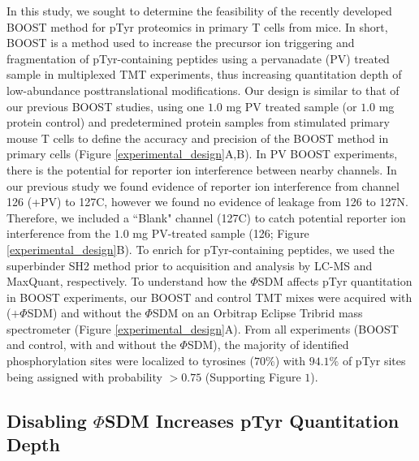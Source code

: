 \documentclass[journal=jprobs,manuscript=article]{achemso}
\begin{document}
In this study, we sought to determine the feasibility of the recently developed BOOST method for pTyr proteomics in primary T cells from mice. In short, BOOST is a method used to increase the precursor ion triggering and fragmentation of pTyr-containing peptides using a pervanadate (PV) treated sample in multiplexed TMT experiments, thus increasing quantitation depth of low-abundance posttranslational modifications\cite{chua2020tandem}. Our design is similar to that of our previous BOOST studies\cite{chua2020tandem,chua2021ovalbumin}, using one $1.0$ mg PV treated sample (or $1.0$ mg protein control) and predetermined protein samples from stimulated primary mouse T cells to define the accuracy and precision of the BOOST method in primary cells (Figure \ref{experimental_design}A,B). In PV BOOST experiments, there is the potential for reporter ion interference between nearby channels\cite{stopfer2021quantitative}. In our previous study we found evidence of reporter ion interference from channel 126 (+PV) to 127C, however we found no evidence of leakage from 126 to 127N\cite{chua2021ovalbumin}. Therefore, we included a ``Blank" channel (127C) to catch potential reporter ion interference from the $1.0$ mg PV-treated sample (126; Figure \ref{experimental_design}B). To enrich for pTyr-containing peptides, we used the superbinder SH2 method\cite{yao2018sh2,yao2019one,chua2020tandem,griffith2021silac} prior to acquisition and analysis by LC-MS and MaxQuant, respectively. To understand how the $\Phi$SDM affects pTyr quantitation in BOOST experiments, our BOOST and control TMT mixes were acquired with ($+\Phi$SDM) and without the $\Phi$SDM on an Orbitrap Eclipse Tribrid mass spectrometer (Figure \ref{experimental_design}A). From all experiments (BOOST and control, with and without the $\Phi$SDM), the majority of identified phosphorylation sites were localized to tyrosines ($70\%$) with $94.1\%$  of pTyr sites being assigned with probability $>0.75$ (Supporting Figure $1$). 


\subsection{Disabling $\Phi$SDM Increases pTyr Quantitation Depth}
\end{document}
